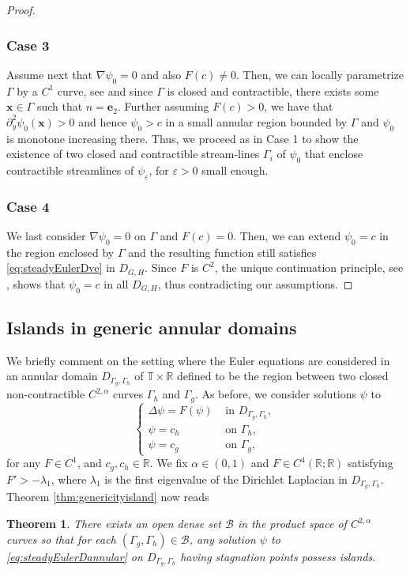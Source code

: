 \documentclass[11pt,reqno]{amsproc}
\newcommand{\R}{\mathbb{R}}
\newcommand{\x}{\mathbf{x}}
\newcommand{\B}{\mathcal{B}}
\newcommand{\ve}{\varepsilon}
\numberwithin{equation}{section}
\newtheorem{theorem}{Theorem}
\numberwithin{theorem}{section}
\numberwithin{prop}{section}
\numberwithin{cor}{section}
\numberwithin{lemma}{section}
\theoremstyle{remark}
\theoremstyle{definition}
\begin{document}
\begin{proof}
\subsubsection*{Case 3} Assume next that $\nabla\psi_0=0$ and also $F(c)\neq 0$. Then, we can locally parametrize $\Gamma$ by a $C^1$ curve, see \cite[Lemma 2.3]{drivas2024geometric} and since $\Gamma$ is closed and contractible, there exists some $\x\in \Gamma$ such that $\hat{n}=\mathbf{e}_2$. Further assuming $F(c)>0$, we have that $\partial_y^2\psi_0(\x)>0$ and hence $\psi_0>c$ in a small annular region bounded by $\Gamma$ and $\psi_0$ is monotone increasing there. Thus, we proceed as in Case 1 to show the existence of two closed and contractible stream-lines $\Gamma_i$ of $\psi_0$ that enclose contractible streamlines of $\psi_\ve$, for $\ve>0$ small enough.

\subsubsection*{Case 4} We last consider $\nabla\psi_0=0$ on $\Gamma$ and $ F(c)=0$. Then, we can extend $\psi_0=c$ in the region enclosed by $\Gamma$ and the resulting function still satisfies \eqref{eq:steadyEulerDve} in $D_{G,H}$. Since $F$ is $C^2$, the unique continuation principle, see \cite{nadirashvili1986uniqueness}, shows that $\psi_0=c$ in all $D_{G,H}$, thus contradicting our assumptions.
\end{proof}

\subsection{Islands in generic annular domains}
We briefly comment on the setting where the Euler equations are considered in an annular domain $D_{\Gamma_g,\Gamma_h}$  of $\mathbb{T}\times\R$ defined to be the region between  two closed non-contractible  $C^{2,\alpha}$ curves $\Gamma_h$ and $\Gamma_g$. As before, we consider solutions $\psi$ to  
\begin{equation}\label{eq:steadyEulerDannular}
\begin{cases}
\Delta\psi = F(\psi) & \text{ in } D_{\Gamma_g,\Gamma_h}, \\
\psi=c_h & \text{ on } \Gamma_h, \\
\psi=c_g & \text{ on } \Gamma_g,
\end{cases}
\end{equation}
for any $F\in C^1$, and $c_g,c_h\in \R$. We fix $\alpha\in (0,1)$ and $F\in C^4(\mathbb{R};\mathbb{R})$ satisfying  $F'>-\lambda_1$, where $\lambda_1$ is the first eigenvalue of the Dirichlet Laplacian in $D_{\Gamma_g,\Gamma_h}$. Theorem \ref{thm:genericityisland} now reads
\begin{theorem}\label{thm:annulargenericityisland}
There exists an open dense set $\B$ in the product space of $C^{2,\alpha}$ curves so that for each $(\Gamma_g,\Gamma_h)\in \B$,  any solution $\psi$ to \eqref{eq:steadyEulerDannular}  on $D_{\Gamma_g,\Gamma_h}$  having stagnation points possess islands.
\end{theorem}
\end{document}

